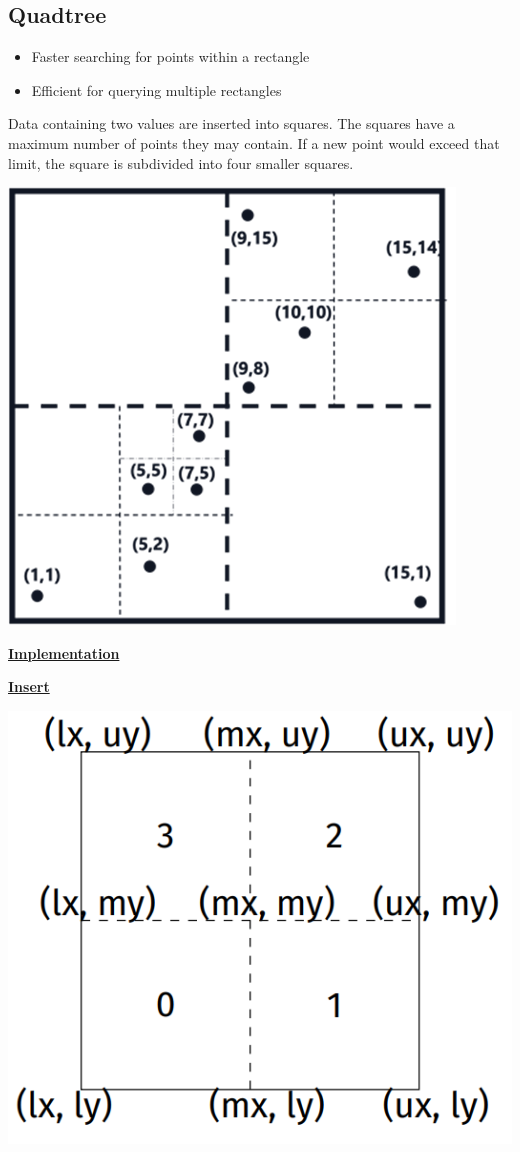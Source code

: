\subsection{Quadtree}
    \begin{itemize}
        \item Faster searching for points within a rectangle
        \item Efficient for querying multiple rectangles
    \end{itemize}
    Data containing two values are inserted into squares. The squares have a maximum number of points they may contain. If a new point would exceed that limit, the square is subdivided into four smaller squares.\\
    {\centering \includegraphics[width = 0.5\linewidth]{src/4_data_structure/images/quadtree.png} \par}

    {\centering\underline{\textbf{Implementation}}\par}
        

    {\centering\underline{\textbf{Insert}}\par}
        {\centering \includegraphics[width = 0.6\linewidth]{src/4_data_structure/images/quad_divide.png} \par}
        
    
